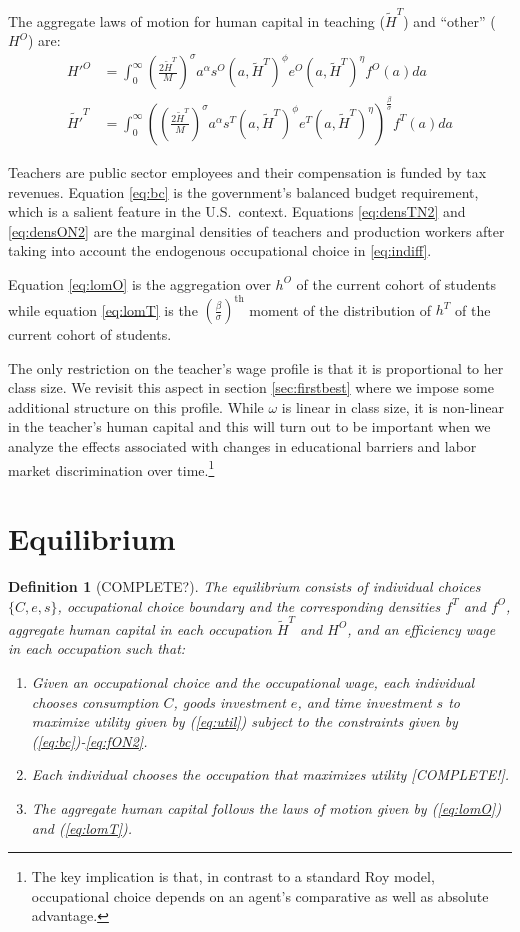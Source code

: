 \documentclass[onehalfspacing,11pt]{article}
\newtheorem{df}{Definition}
\begin{document}
The aggregate laws of motion for human capital in teaching ($\widetilde{H}^T$) and ``other'' (${H}^O$) are:
\begin{align}
\label{eq:lomO}
{H'}^{O} & = \int_0^\infty \left(\tfrac{2 \widetilde{H}^T}{M}\right)^\sigma a^\alpha s^O\left(a,\widetilde{H}^T\right)^\phi e^O(a,\widetilde{H}^T)^\eta  f^O(a) da \\
\label{eq:lomT}
\widetilde{H'}^{T} & = \int_0^\infty \left(\left(\tfrac{2 \widetilde{H}^T}{M}\right)^\sigma a^\alpha s^T\left(a,\widetilde{H}^T\right)^\phi e^T(a,\widetilde{H}^T)^\eta \right)^{\frac{\beta}{\sigma}} f^T(a) da 
\end{align}
 
Teachers are public sector employees and their compensation is funded by tax revenues. Equation \eqref{eq:bc} is the government's balanced budget requirement, which is a salient feature in the U.S.~context. Equations \eqref{eq:densTN2} and \eqref{eq:densON2} are the marginal densities of teachers and production workers after taking into account the endogenous occupational choice in \eqref{eq:indiff}.

Equation \eqref{eq:lomO} is the aggregation over $h^O$ of the current cohort of students while equation \eqref{eq:lomT} is the ${\left( \tfrac{\beta}{\sigma} \right)}^{\textrm{th}}$ moment of the distribution of $h^T$ of the current cohort of students.

The only restriction on the teacher's wage profile is that it is proportional to her class size. We revisit this aspect in section \ref{sec:firstbest} where we impose some additional structure on this profile. While $\omega$ is linear in class size, it is non-linear in the teacher's human capital and this will turn out to be important when we analyze the effects associated with changes in educational barriers and labor market discrimination over time.\footnote{The key implication is that, in contrast to a standard Roy model, occupational choice depends on an agent's comparative as well as absolute advantage.}

\section{Equilibrium}
\begin{df}[COMPLETE?]
The equilibrium consists of individual choices $\{C, e, s\}$, occupational choice boundary and the corresponding densities $f^T$ and $f^O$, aggregate human capital in each occupation $\widetilde{H}^{T}$ and ${H}^{O}$, and an efficiency wage in each occupation such that:
\begin{enumerate}
  \item Given an occupational choice and the occupational wage, each individual chooses consumption $C$, goods investment $e$, and time investment $s$ to maximize utility given by (\ref{eq:util}) subject to the constraints given by (\ref{eq:bc})-\eqref{eq:fON2}.
  \item Each individual chooses the occupation that maximizes utility [COMPLETE!].
  \item The aggregate human capital follows the laws of motion given by (\ref{eq:lomO}) and (\ref{eq:lomT}).
\end{enumerate}
\end{df}
\end{document}
